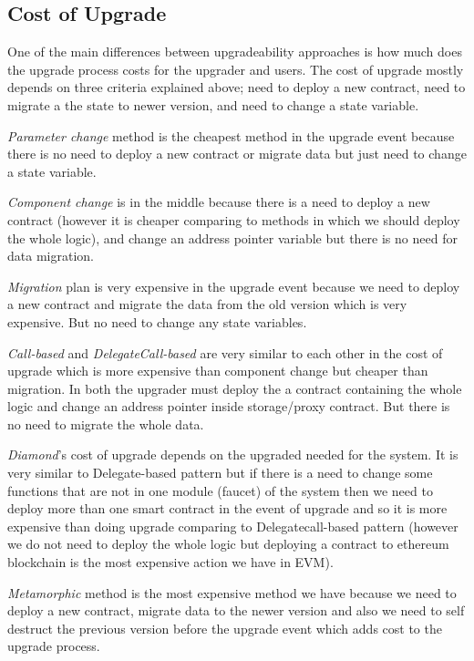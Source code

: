 \subsection{Cost of Upgrade}

 One of the main differences between upgradeability approaches is how much does the upgrade process costs for the upgrader and users. The cost of upgrade mostly depends on three criteria explained above; need to deploy a new contract, need to migrate a the state to newer version, and need to change a state variable.

 \textit{Parameter change} method is the cheapest method in the upgrade event because there is no need to deploy a new contract or migrate data but just need to change a state variable.

 \textit{Component change} is in the middle because there is a need to deploy a new contract (however it is cheaper comparing to methods in which we should deploy the whole logic), and change an address pointer variable but there is no need for data migration.

 \textit{Migration} plan is very expensive in the upgrade event because we need to deploy a new contract and migrate the data from the old version which is very expensive. But no need to change any state variables.

 \textit{Call-based} and \textit{DelegateCall-based} are very similar to each other in the cost of upgrade which is more expensive than component change but cheaper than migration. In both the upgrader must deploy the a contract containing the whole logic and change an address pointer inside storage/proxy contract. But there is no need to migrate the whole data.
 
 \textit{Diamond}'s cost of upgrade depends on the upgraded needed for the system. It is very similar to Delegate-based pattern but if there is a need to change some functions that are not in one module (faucet) of the system then we need to deploy more than one smart contract in the event of upgrade and so it is more expensive than doing upgrade comparing to Delegatecall-based pattern (however we do not need to deploy the whole logic but deploying a contract to ethereum blockchain is the most expensive action we have in EVM).

 \textit{Metamorphic} method is the most expensive method we have because we need to deploy a new contract, migrate data to the newer version and also we need to self destruct the previous version before the upgrade event which adds cost to the upgrade process.

